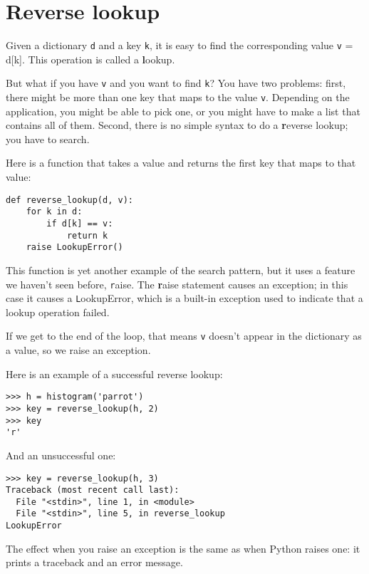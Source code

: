 \documentclass[
DIV=11,
fontsize=12,
twoside,
headinclude=false,
titlepage=firstiscover,
abstract=true,
headsepline=true,
footsepline=true,
chapterprefix=true, %
headings=big,
bibliography=totoc,%
captions=tableheading
]{scrbook}
\theoremstyle{definition}
\begin{document}
\section{Reverse lookup}
\label{raise}

Given a dictionary {\texttt d} and a key {\texttt k}, it is easy to
find the corresponding value {\texttt v = d[k]}.  This operation
is called a {\textbf lookup}.

But what if you have {\texttt v} and you want to find {\texttt k}?
You have two problems: first, there might be more than one
key that maps to the value {\texttt v}.  Depending on the application,
you might be able to pick one, or you might have to make
a list that contains all of them.  Second, there is no
simple syntax to do a {\textbf reverse lookup}; you have to search.

Here is a function that takes a value and returns the first
key that maps to that value:

\begin{lstlisting}
def reverse_lookup(d, v):
    for k in d:
        if d[k] == v:
            return k
    raise LookupError()
\end{lstlisting}
%
This function is yet another example of the search pattern, but it
uses a feature we haven't seen before, {\texttt raise}.  The 
{\textbf raise statement} causes an exception; in this case it causes a
{\texttt LookupError}, which is a built-in exception used to indicate
that a lookup operation failed.
  
 

If we get to the end of the loop, that means {\texttt v}
doesn't appear in the dictionary as a value, so we raise an
exception.

Here is an example of a successful reverse lookup:

\begin{lstlisting}
>>> h = histogram('parrot')
>>> key = reverse_lookup(h, 2)
>>> key
'r'
\end{lstlisting}
%
And an unsuccessful one:

\begin{lstlisting}
>>> key = reverse_lookup(h, 3)
Traceback (most recent call last):
  File "<stdin>", line 1, in <module>
  File "<stdin>", line 5, in reverse_lookup
LookupError
\end{lstlisting}
%
The effect when you raise an exception is the same as when
Python raises one: it prints a traceback and an error message.
\end{document}
